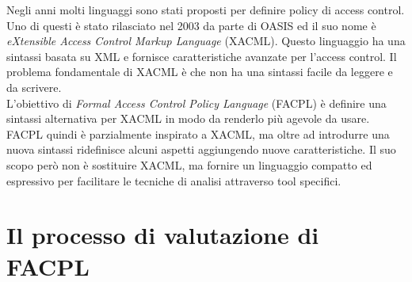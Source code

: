 \label{cap:facpl}
Negli anni molti linguaggi sono stati proposti per definire policy di access control. Uno di questi è stato rilasciato nel 2003 da parte di OASIS ed il suo nome è \textit{eXtensible Access Control Markup Language} (XACML). Questo linguaggio ha una sintassi basata su XML e fornisce caratteristiche avanzate per l'access control. Il problema fondamentale di XACML è che non ha una sintassi facile da leggere e da scrivere. \\
L'obiettivo di \textit{Formal Access Control Policy Language} (FACPL) è definire una sintassi alternativa per XACML in modo da renderlo più agevole da usare.
FACPL quindi è parzialmente inspirato a XACML, ma oltre ad introdurre una nuova sintassi ridefinisce alcuni aspetti aggiungendo nuove caratteristiche. Il suo scopo però non è sostituire XACML, ma fornire un linguaggio compatto ed espressivo per facilitare le tecniche di analisi attraverso tool specifici.

\section{Il processo di valutazione di FACPL}
\label{sec:valutazione_facpl}



